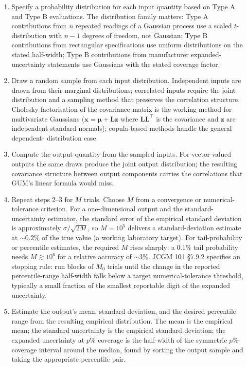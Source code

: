 \begin{enumerate}[leftmargin=*]
  \item Specify a probability distribution for each input quantity
    based on Type A and Type B evaluations. The distribution
    family matters: Type A contributions from $n$ repeated readings
    of a Gaussian process use a scaled $t$-distribution with $n-1$
    degrees of freedom, not Gaussian; Type B contributions from
    rectangular specifications use uniform distributions on the
    stated half-width; Type B contributions from manufacturer
    expanded-uncertainty statements use Gaussians with the stated
    coverage factor.
  \item Draw a random sample from each input distribution.
    Independent inputs are drawn from their marginal distributions;
    correlated inputs require the joint distribution and a sampling
    method that preserves the correlation structure. Cholesky
    factorisation of the covariance matrix is the working method
    for multivariate Gaussians ($\mathbf{x} = \boldsymbol{\mu} +
    \mathbf{L} \mathbf{z}$ where $\mathbf{L}\mathbf{L}^{\top}$ is
    the covariance and $\mathbf{z}$ are independent standard
    normals); copula-based methods handle the general dependent-
    distribution case.
  \item Compute the output quantity from the sampled inputs. For
    vector-valued outputs the same draws produce the joint output
    distribution; the resulting covariance structure between
    output components carries the correlations that GUM's linear
    formula would miss.
  \item Repeat steps 2--3 for $M$ trials. Choose $M$ from a
    convergence or numerical-tolerance criterion. For a
    one-dimensional output and the standard-uncertainty estimator,
    the standard error of the empirical standard deviation is
    approximately $\sigma/\sqrt{2M}$, so $M = 10^{5}$ delivers a
    standard-deviation estimate at $\sim 0.2\%$ of the true value
    (a working laboratory target). For tail-probability or
    percentile estimates, the required $M$ rises sharply: a $0.1\%$
    tail probability needs $M \gtrsim 10^{6}$ for a relative
    accuracy of $\sim 3\%$. JCGM 101 \S 7.9.2 specifies an
     stopping rule: run blocks of $M_{0}$ trials
    until the change in the reported percentile-range half-width
    falls below a target numerical-tolerance threshold, typically a
    small fraction of the smallest reportable digit of the
    expanded uncertainty.
  \item Estimate the output's mean, standard deviation, and the
    desired percentile range from the resulting empirical
    distribution. The mean is the empirical mean; the standard
    uncertainty is the empirical standard deviation; the expanded
    uncertainty at $p\%$ coverage is the half-width of the
    symmetric $p\%$-coverage interval around the median, found by
    sorting the output sample and taking the appropriate
    percentile pair.
\end{enumerate}

